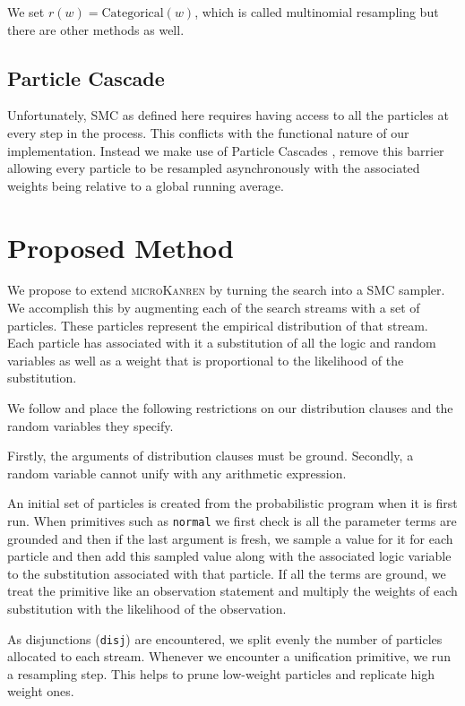 \documentclass[
]{ceurart}
\begin{document}
We set $r(w) = \text{Categorical}(w)$, which is called multinomial resampling but there are other methods
as well\cite{douc2005comparison}.

\subsection{Particle Cascade}

Unfortunately, SMC as defined here requires having access to all the
particles at every step in the process. This conflicts with the
functional nature of our implementation. Instead we make use of
Particle Cascades \cite{PaigeWDT14}, remove this barrier allowing every
particle to be resampled asynchronously with the associated weights
being relative to a global running average. %

\section{Proposed Method}

We propose to extend \textsc{microKanren} by turning the search into a
SMC sampler. We accomplish this by augmenting each of the search
streams with a set of particles. These particles represent the
empirical distribution of that stream. Each particle has associated
with it a substitution of all the logic and random variables as well
as a weight that is proportional to the likelihood of the
substitution.

We follow \cite{gutmann2010extending} and place the following restrictions
on our distribution clauses and the random variables they specify.

Firstly, the arguments of distribution clauses must be
ground. Secondly, a random variable cannot unify with any arithmetic
expression.

An initial set of particles is created from the probabilistic program
when it is first run. When primitives such as \texttt{normal} we first
check is all the parameter terms are grounded and then if the last
argument is fresh, we sample a value for it for each particle and then
add this sampled value along with the associated logic variable to the
substitution associated with that particle. If all the terms are ground,
we treat the primitive like an observation statement and multiply the
weights of each substitution with the likelihood of the observation.

As disjunctions (\texttt{disj}) are encountered, we split evenly the
number of particles allocated to each stream. Whenever we encounter a
unification primitive, we run a resampling step. This helps to prune
low-weight particles and replicate high weight ones.
\end{document}
